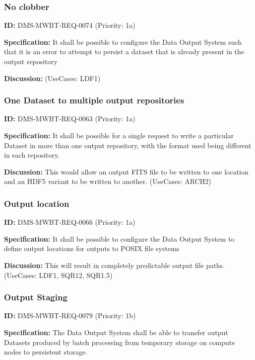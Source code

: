 \documentclass[SE,toc,lsstdraft]{lsstdoc}
\begin{document}
\subsubsection{No clobber}

\label{DMS-MWBT-REQ-0074}
\textbf{ID:} DMS-MWBT-REQ-0074 (Priority: 1a)

\textbf{Specification:}
It shall be possible to configure the Data Output System such that it is an error to attempt to persist a dataset that is already present in the output repository

\textbf{Discussion:}
(UseCases: LDF1)

\subsubsection{One Dataset to multiple output repositories}

\label{DMS-MWBT-REQ-0063}
\textbf{ID:} DMS-MWBT-REQ-0063 (Priority: 1a)

\textbf{Specification:}
It shall be possible for a single request to write a particular Dataset in more than one output repository, with the format used being different in each repository.

\textbf{Discussion:}
This would allow an output FITS file to be written to one location and an HDF5 variant to be written to another. (UseCases: ARCH2)

\subsubsection{Output location}

\label{DMS-MWBT-REQ-0066}
\textbf{ID:} DMS-MWBT-REQ-0066 (Priority: 1a)

\textbf{Specification:}
It shall be possible to configure the Data Output System to define output locations for outputs to POSIX file systems

\textbf{Discussion:}
This will result in completely predictable output file paths. (UseCases: LDF1, SQR12, SQR1.5)

\subsubsection{Output Staging}

\label{DMS-MWBT-REQ-0079}
\textbf{ID:} DMS-MWBT-REQ-0079 (Priority: 1b)

\textbf{Specification:}
The Data Output System shall be able to transfer output Datasets produced by batch processing from temporary storage on compute nodes to persistent storage.
\end{document}
